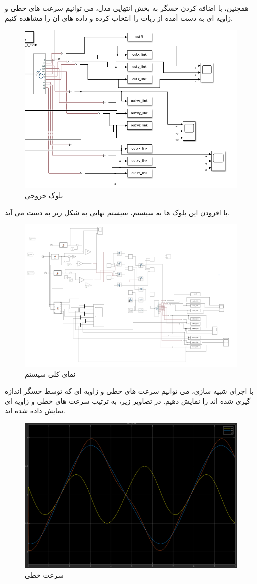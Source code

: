 \FloatBarrier
همچنین، با اضافه کردن حسگر به بخش انتهایی مدل، می توانیم سرعت های خطی و زاویه ای به دست آمده از ربات را انتخاب کرده و داده های ان را مشاهده کنیم.
\begin{figure}[htbp]
	\centering
	\includegraphics[width=0.7\linewidth]{../img/output}
	\caption{بلوک خروجی}
	\label{fig:output}
\end{figure}
\FloatBarrier
با افزودن این بلوک ها به سیستم، سیستم نهایی به شکل زیر به دست می آید.
\begin{figure}[htbp]
	\centering
	\includegraphics[width=0.7\linewidth]{../img/all}
	\caption{نمای کلی سیستم}
	\label{fig:all}
\end{figure}
\FloatBarrier
با اجرای شبیه سازی، می توانیم سرعت های خطی و زاویه ای که توسط حسگر اندازه گیری شده اند را نمایش دهیم. در تصاویر زیر، به ترتیب سرعت های خطی و زاویه ای نمایش داده شده اند.
\begin{figure}[htbp]
	\centering
	\includegraphics[width=0.65\linewidth]{../img/v_out_plot}
	\caption{سرعت خطی}
	\label{fig:voutplot}
\end{figure}
